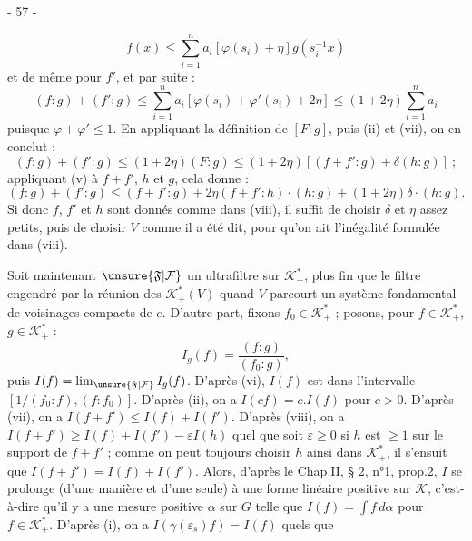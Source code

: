 
\begin{center}- 57 -\end{center}

\[
f(x)\leq\sum_{i=1}^{n}a_i[\varphi(s_i)+\eta]g(s_i^{-1}x)
\]
et de même pour $f'$, et par suite :
\[
(f:g)+(f':g)\leq\sum_{i=1}^{n}a_i[\varphi(s_i)+\varphi'(s_i)+2\eta]\leq(1+2\eta)\sum_{i=1}^{n}a_i
\]
puisque $\varphi+\varphi'\leq1$. En appliquant la définition de $[F:g]$, puis (ii) et (vii), on en conclut :
\[
(f:g)+(f':g)\leq(1+2\eta)(F:g)\leq(1+2\eta)[(f+f':g)+\delta(h:g)]\ ;
\]
appliquant (v) à $f+f'$, $h$ et $g$, cela donne :
\[
(f:g)+(f':g)\leq(f+f':g)+2\eta(f+f':h)\cdot(h:g)+(1+2\eta)\delta\cdot(h:g).
\]
Si donc $f$, $f'$ et $h$ sont donnés comme dans (viii), il suffit de choisir $\delta$ et $\eta$ assez petits, puis de choisir $V$ comme il a été dit, pour qu'on ait l'inégalité formulée dans (viii).

Soit maintenant $\unsure{\mathfrak{F}|\mathcal{F}}$ un ultrafiltre sur $\mathcal{K}^{*}_{+}$, plus fin que le filtre engendré par la réunion des $\mathcal{K}^{*}_{+}(V)$ quand $V$ parcourt un système fondamental de voisinages compacts de $e$. D'autre part, fixons $f_0\in\mathcal{K}^{*}_{+}$ ; posons, pour $f\in\mathcal{K}^{*}_{+}$, $g\in\mathcal{K}^{*}_{+}$ :
\[
I_g(f)=\frac{(f:g)}{(f_0:g)},
\]
puis $I(f)=\lim_{\unsure{\mathfrak{F}|\mathcal{F}}}I_g(f)$. D'après (vi), $I(f)$ est dans l'intervalle $[1/(f_0:f),(f:f_0)]$. D'après (ii), on a $I(cf)=c.I(f)$ pour $c>0$. D'après (vii), on a $I(f+f')\leq I(f)+I(f')$. D'après (viii), on a $I(f+f')\geq I(f)+I(f')-\varepsilon I(h)$ quel que soit $\varepsilon\geq0$ si $h$ est $\geq1$ sur le support de $f+f'$ ; comme on peut toujours choisir $h$ ainsi dans $\mathcal{K}^{*}_{+}$, il s'ensuit que $I(f+f')=I(f)+I(f')$. Alors, d'après le Chap.II, § 2, n°1, prop.2, $I$ se prolonge (d'une manière et d'une seule) à une forme linéaire positive sur $\mathcal{K}$, c'est-à-dire qu'il y a une mesure positive $\alpha$ sur $G$ telle que $I(f)=\int f\,d\alpha$ pour $f\in\mathcal{K}^{*}_{+}$. D'après (i), on a $I(\gamma(\varepsilon_s)f)=I(f)$ quels que
